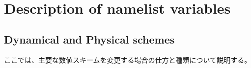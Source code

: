 \section{Description of namelist variables}
\subsection{Dynamical and Physical schemes}

ここでは、主要な数値スキームを変更する場合の仕方と種類について説明する。
